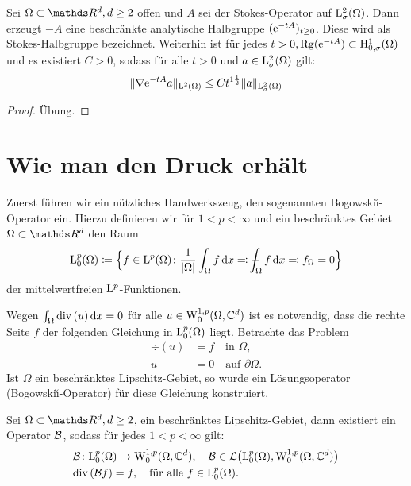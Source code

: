 \begin{thm}
  Sei $\Omega \subset \R^d, d \geq 2$ offen und $A$ sei der Stokes-Operator auf $\mathrm{L}^2_\sigma(\Omega)$.
  Dann erzeugt $-A$ eine beschränkte analytische Halbgruppe $(\mathrm{e}^{-tA})_{t \geq 0}$.
  Diese wird als Stokes-Halbgruppe bezeichnet.
  Weiterhin ist für jedes $t > 0, \operatorname{Rg}(\mathrm{e}^{-tA}) \subset \mathrm{H}_{0,\sigma}^1(\Omega)$ und es existiert $C > 0$, sodass für alle $t > 0$ und $a \in \mathrm{L}_\sigma^2(\Omega)$ gilt:
  $$
  \|\nabla \mathrm{e}^{-tA} a \|_{\mathrm{L}^2(\Omega)} \leq C t^{1\frac{1}{2}} \|a\|_{\mathrm{L}_\sigma^2(\Omega)}
  $$
\end{thm}

\begin{proof}
  Übung.
\end{proof}

\section{Wie man den Druck erhält}

Zuerst führen wir ein nützliches Handwerkszeug, den sogenannten Bogowski\u{\i}-Operator ein.
Hierzu definieren wir für $1 < p < \infty$ und ein beschränktes Gebiet $\Omega \subset \R^d$ den Raum
$$
\Ell^p_0(\Omega) \coloneqq \Big\{ f \in \Ell^p(\Omega) \colon \frac{1}{|\Omega|} \int_\Omega f \d x \eqqcolon \dashint_\Omega f \d x \eqqcolon f_\Omega = 0 \Big\}
$$
der mittelwertfreien $\mathrm{L}^p$-Funktionen.

Wegen $\int_\Omega \mathrm{div\,} (u) \, {\operatorname{d}\!{x}} = 0$ für alle $u \in \mathrm{W}_0^{1,p}(\Omega, \mathbb{C}^d)$ ist es notwendig, dass die rechte Seite $f$ der folgenden Gleichung in $\mathrm{L}^p_0(\Omega)$ liegt.
Betrachte das Problem
\begin{align*}
  \div(u) &= f \quad\text{in } \Omega, \\
  u &= 0 \quad\text{auf } \partial \Omega.
\end{align*}
Ist $\Omega$ ein beschränktes Lipschitz-Gebiet, so wurde ein Lösungsoperator (Bogowski\u{\i}-Operator) für diese Gleichung konstruiert.

\begin{thm}
  \label{thm:bogowskii}
  Sei $\Omega \subset \R^d, d \geq 2$, ein beschränktes Lipschitz-Gebiet, dann existiert ein Operator $\mathcal{B}$, sodass für jedes $1 < p < \infty$ gilt:
  \begin{align*}
    &\mathcal{B} \colon \mathrm{L}_0^p(\Omega) \to \mathrm{W}_0^{1,p}(\Omega, \mathbb{C}^d), \quad \mathcal{B} \in \mathcal{L}\big(\mathrm{L}_0^p(\Omega), \mathrm{W}_0^{1,p}(\Omega, \mathbb{C}^d)\big) \\
    &\mathrm{div\,} (\mathcal{B} f) = f, \quad\text{für alle } f \in \mathrm{L}_0^p(\Omega).
  \end{align*}
\end{thm}

